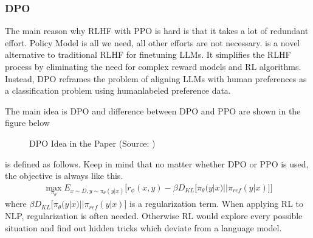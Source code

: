 \documentclass[letterpaper,11pt,english]{sphinxmanual}
\begin{document}
\subsubsection{DPO}
\label{\detokenize{finetuning:dpo}}
\sphinxAtStartPar
The main reason why RLHF with PPO is hard is that it takes a lot of
redundant effort. Policy Model is all we need, all other efforts are not
necessary.  is a novel
alternative to traditional RLHF for fine\sphinxhyphen{}tuning LLMs. It simplifies the
RLHF process by eliminating the need for complex reward models and RL
algorithms. Instead, DPO reframes the problem of aligning LLMs with
human preferences as a classification problem using human\sphinxhyphen{}labeled
preference data. 

\sphinxAtStartPar
The main idea is DPO and difference between DPO and PPO are shown in the
figure below

\begin{figure}[htbp]
\centering
\capstart

\noindent{}
\caption{DPO Idea in the Paper (Source: )}\label{\detokenize{finetuning:id16}}\end{figure}

\sphinxAtStartPar
{}

\sphinxAtStartPar
{} is defined as follows. Keep in mind that no matter
whether DPO or PPO is used, the objective is always like this.
\begin{equation*}
\begin{split}\max_{\pi_\theta} E_{x \sim D, y \sim \pi_\theta(y|x)}\Big[r_{\phi}(x,y) - \beta D_{KL}\big[\pi_\theta(y|x) || \pi_{ref}(y|x)\big]\Big]\end{split}
\end{equation*}
\sphinxAtStartPar
where \(\beta D_{KL}\big[\pi_\theta(y|x) || \pi_{ref}(y|x)\big]\) is
a regularization term. When applying RL to NLP, regularization is often
needed. Otherwise RL would explore every possible situation and find out
hidden tricks which deviate from a language model.
\end{document}
